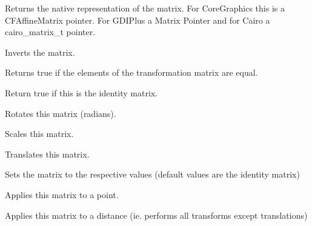 Returns the native representation of the matrix. For CoreGraphics this is a CFAffineMatrix pointer. For GDIPlus a Matrix Pointer and for Cairo a cairo\_matrix\_t pointer.

\label{wxgraphicsmatrixinvert}


Inverts the matrix.

\label{wxgraphicsmatrixisequal}


Returns true if the elements of the transformation matrix are equal.

\label{wxgraphicsmatrixisidentity}


Return true if this is the identity matrix.

\label{wxgraphicsmatrixrotate}


Rotates this matrix (radians).

\label{wxgraphicsmatrixscale}


Scales this matrix.

\label{wxgraphicsmatrixtranslate}


Translates this matrix.

\label{wxgraphicsmatrixset}


Sets the matrix to the respective values (default values are the identity matrix)

\label{wxgraphicsmatrixtransformpoint}


Applies this matrix to a point.

\label{wxgraphicsmatrixtransformdistance}


Applies this matrix to a distance (ie. performs all transforms except translations)



